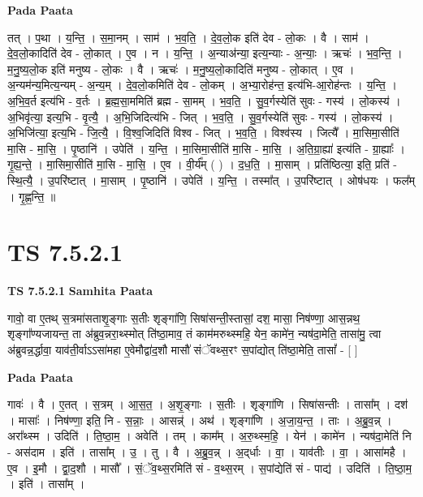 \documentclass[17pt]{extarticle}
\begin{document}
\textbf{Pada Paata} \newline

तत् । प॒था । य॒न्ति॒ । स॒मा॒नम् । साम॑ । भ॒व॒ति॒ । दे॒व॒लो॒क इति॑ देव - लो॒कः । वै । साम॑ । दे॒व॒लो॒कादिति॑ देव - लो॒कात् । ए॒व । न । य॒न्ति॒ । अ॒न्या‌अ॑न्या॒ इत्य॒न्याः - अ॒न्याः॒ । ऋचः॑ । भ॒व॒न्ति॒ । म॒नु॒ष्य॒लो॒क इति॑ मनुष्य - लो॒कः । वै । ऋचः॑ । म॒नु॒ष्य॒लो॒कादिति॑ मनुष्य - लो॒कात् । ए॒व । अ॒न्यम॑न्य॒मित्य॒न्यम् - अ॒न्य॒म् । दे॒व॒लो॒कमिति॑ देव - लो॒कम् । अ॒भ्या॒रोह॑न्त॒ इत्य॑भि-आ॒रोह॑न्तः । य॒न्ति॒ । अ॒भि॒व॒र्त इत्य॑भि  -  व॒र्तः । ब्र॒ह्म॒सा॒ममिति॑ ब्रह्म - सा॒मम् । भ॒व॒ति॒ । सु॒व॒र्गस्येति॑ सुवः - गस्य॑ । लो॒कस्य॑ । अ॒भिवृ॑त्या॒ इत्य॒भि - वृ॒त्यै॒ । अ॒भि॒जिदित्य॑भि - जित् । भ॒व॒ति॒ । सु॒व॒र्गस्येति॑ सुवः - गस्य॑ । लो॒कस्य॑ । अ॒भिजि॑त्या॒ इत्य॒भि - जि॒त्यै॒ । वि॒श्व॒जिदिति॑ विश्व - जित् । भ॒व॒ति॒ । विश्व॑स्य । जित्यै᳚ । मा॒सिमा॒सीति॑ मा॒सि - मा॒सि॒ । पृ॒ष्ठानि॑ । उपेति॑ । य॒न्ति॒ । मा॒सिमा॒सीति॑ मा॒सि - मा॒सि॒ । अ॒ति॒ग्रा॒ह्या॑ इत्य॑ति - ग्रा॒ह्याः᳚ । गृ॒ह्य॒न्ते॒ । मा॒सिमा॒सीति॑ मा॒सि - मा॒सि॒ । ए॒व । वी॒र्य᳚म् ( ) । द॒ध॒ति॒ । मा॒साम् । प्रति॑ष्ठित्या॒ इति॒ प्रति॑ - स्थि॒त्यै॒ । उ॒परि॑ष्टात् । मा॒साम् । पृ॒ष्ठानि॑ । उपेति॑ । य॒न्ति॒ । तस्मा᳚त् । उ॒परि॑ष्टात् । ओष॑धयः । फल᳚म् । गृ॒ह्ण॒न्ति॒ ॥  \newline




\section*{ TS 7.5.2.1 }

\textbf{TS 7.5.2.1 } \newline
\textbf{Samhita Paata} \newline

गावो॒ वा ए॒तथ् स॒त्रमा॑सताशृ॒ङ्गाः स॒तीः शृङ्गा॑णि॒ सिषा॑सन्ती॒स्तासां॒ दश॒ मासा॒ निष॑ण्णा॒ आस॒न्नथ॒ शृङ्गा᳚ण्यजायन्त॒ ता अ॑ब्रुव॒न्नरा॒थ्स्मोत् ति॑ष्ठा॒माव॒ तं काम॑मरुथ्स्महि॒ येन॒ कामे॑न॒ न्यष॑दा॒मेति॒ तासा॑मु॒ त्वा अ॑ब्रुवन्न॒र्द्धावा॒ याव॑ती॒र्वाऽऽसा॑महा ए॒वेमौद्वा॑द॒शौ मासौ॑ संॅवथ्स॒रꣳ स॒पांद्योत् ति॑ष्ठा॒मेति॒ तासां᳚ - [  ] \newline

\textbf{Pada Paata} \newline

गावः॑ । वै । ए॒तत् । स॒त्रम् । आ॒स॒त॒ । अ॒शृ॒ङ्गाः । स॒तीः । शृङ्गा॑णि । सिषा॑सन्तीः । तासा᳚म् । दश॑ । मासाः᳚ । निष॑ण्णा॒ इति॒ नि - स॒न्नाः॒ । आसन्न्॑ । अथ॑ । शृङ्गा॑णि । अ॒जा॒य॒न्त॒ । ताः । अ॒ब्रु॒व॒न्न् । अरा᳚थ्स्म । उदिति॑ । ति॒ष्ठा॒म॒ । अवेति॑ । तम् । काम᳚म् । अ॒रु॒थ्स्म॒हि॒ । येन॑ । कामे॑न । न्यष॑दा॒मेति॑ नि - अस॑दाम । इति॑ । तासा᳚म् । उ॒ । तु । वै । अ॒ब्रु॒व॒न्न् । अ॒द्‌र्धाः । वा॒ । याव॑तीः । वा॒ । आसा॑महै । ए॒व । इ॒मौ । द्वा॒द॒शौ । मासौ᳚ । सं॒ॅव॒थ्स॒रमिति॑ सं - व॒थ्स॒रम् । स॒पांद्येति॑ सं - पाद्य॑ । उदिति॑ । ति॒ष्ठा॒म॒ । इति॑ । तासा᳚म् ।  \newline
\end{document}
